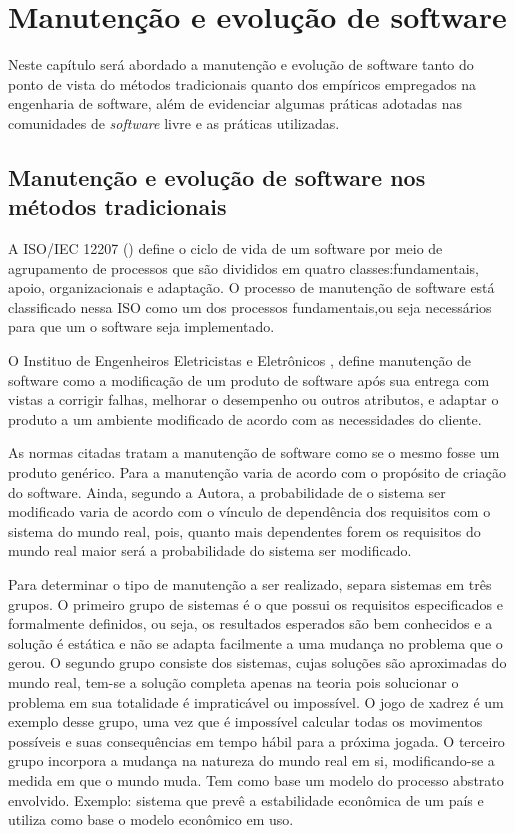 \chapter{Manutenção e evolução de software}
\label{cap-evol-software}

Neste capítulo será abordado a manutenção e evolução de software tanto do ponto de vista do métodos tradicionais quanto dos empíricos empregados na engenharia de software, além de evidenciar algumas práticas adotadas nas comunidades de \textit{software} livre e as práticas utilizadas.

\section{Manutenção e evolução de software nos métodos tradicionais}
\label{sect-manut-evol-soft}

A ISO/IEC 12207 (\citeyear{iso12207}) define o ciclo de vida de um software por meio de agrupamento de processos que são divididos em quatro classes:fundamentais, apoio, organizacionais e adaptação. O processo de manutenção de software está classificado nessa ISO como um dos processos fundamentais,ou seja necessários para que um o software seja implementado.


O Instituo de Engenheiros Eletricistas e Eletrônicos \cite{ieee1219}, define manutenção de software como a modificação de um produto de software após sua entrega com vistas a corrigir falhas, melhorar o desempenho ou outros atributos, e adaptar o produto a um ambiente modificado de acordo com as necessidades do cliente.

As normas citadas tratam a manutenção de software como se o mesmo fosse um produto genérico. Para  a manutenção varia de acordo com o propósito de criação do software. Ainda, segundo a Autora, a probabilidade de o sistema ser modificado varia de acordo com o vínculo de dependência dos requisitos com o sistema do mundo real, pois, quanto mais dependentes forem os requisitos do mundo real maior será a probabilidade do sistema ser modificado.

Para determinar o tipo de manutenção a ser realizado, separa sistemas em três grupos. O primeiro grupo de sistemas é o que possui os requisitos especificados e formalmente definidos, ou seja, os resultados esperados são bem conhecidos e a solução é estática e não se adapta facilmente a uma mudança no problema que o gerou. O segundo grupo consiste dos sistemas, cujas soluções são aproximadas do mundo real, tem-se a solução completa apenas na teoria pois solucionar o problema em sua totalidade é impraticável ou impossível. O jogo de xadrez é um exemplo desse grupo, uma vez que é impossível calcular todas os movimentos possíveis e suas consequências em tempo hábil para a próxima jogada. O terceiro grupo incorpora a mudança na natureza do mundo real em si,  modificando-se a medida em que o mundo muda. Tem como base um modelo do processo abstrato envolvido. Exemplo: sistema que prevê a estabilidade econômica de um país e utiliza como base o modelo econômico em uso.

